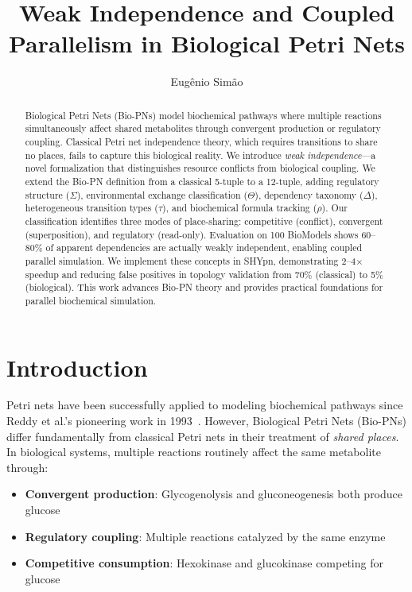 \documentclass[runningheads]{llncs}
\title{Weak Independence and Coupled Parallelism in Biological Petri Nets}
\author{Eugênio Simão\inst{1}}
\institute{
Universidade Federal de Santa Catarina\\
Computer Engineering\\
UFSC - Araranguá - Brazil\\
\email{eugenio.simao@ufsc.br}
}
\begin{document}
\maketitle

\begin{abstract}
Biological Petri Nets (Bio-PNs) model biochemical pathways where multiple reactions simultaneously affect shared metabolites through convergent production or regulatory coupling. Classical Petri net independence theory, which requires transitions to share no places, fails to capture this biological reality. We introduce \emph{weak independence}---a novel formalization that distinguishes resource conflicts from biological coupling. We extend the Bio-PN definition from a classical 5-tuple to a 12-tuple, adding regulatory structure ($\Sigma$), environmental exchange classification ($\Theta$), dependency taxonomy ($\Delta$), heterogeneous transition types ($\tau$), and biochemical formula tracking ($\rho$). Our classification identifies three modes of place-sharing: competitive (conflict), convergent (superposition), and regulatory (read-only). Evaluation on 100 BioModels shows 60--80\% of apparent dependencies are actually weakly independent, enabling coupled parallel simulation. We implement these concepts in SHYpn, demonstrating 2--4$\times$ speedup and reducing false positives in topology validation from 70\% (classical) to 5\% (biological). This work advances Bio-PN theory and provides practical foundations for parallel biochemical simulation.

\end{abstract}

\section{Introduction}

Petri nets have been successfully applied to modeling biochemical pathways since Reddy et al.'s pioneering work in 1993~\cite{Reddy1993}. However, Biological Petri Nets (Bio-PNs) differ fundamentally from classical Petri nets in their treatment of \emph{shared places}. In biological systems, multiple reactions routinely affect the same metabolite through:
\begin{itemize}
    \item \textbf{Convergent production}: Glycogenolysis and gluconeogenesis both produce glucose
    \item \textbf{Regulatory coupling}: Multiple reactions catalyzed by the same enzyme
    \item \textbf{Competitive consumption}: Hexokinase and glucokinase competing for glucose
\end{itemize}
\end{document}
